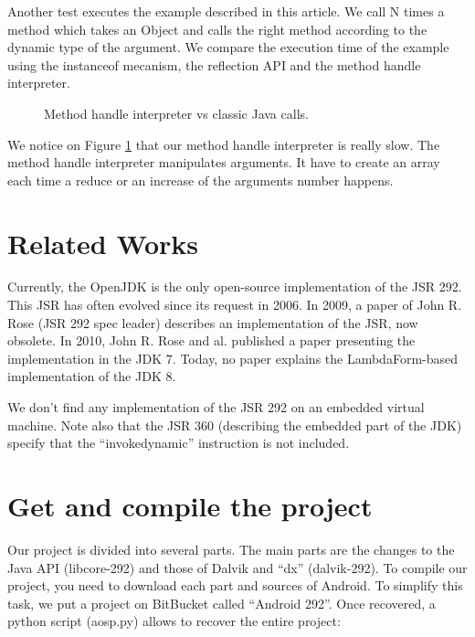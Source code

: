 \documentclass{sig-alternate}
\def \Jsr{JSR\xspace}
\def \JSR{\Jsr 292\xspace}
\begin{document}
  Another test executes the example described in this article.
  We call N times a method which takes an Object and calls the right method according to the dynamic type of the argument.
  We compare the execution time of the example using the instanceof mecanism, the reflection API and the method handle interpreter.

  \begin{figure}[!h]
    \resizebox{\linewidth}{!}{}
    \caption{Method handle interpreter vs classic Java calls.}
    \label{Rmutable}
  \end{figure}

  We notice on Figure \ref{Rmutable} that our method handle interpreter is really slow.
  The method handle interpreter manipulates arguments.
  It have to create an array each time a reduce or an increase of the arguments number happens.

\section{Related Works}

  Currently, the OpenJDK is the only open-source implementation of the \JSR.
  This JSR has often evolved since its request in 2006\cite{jcp-jsr-292}.
  In 2009, a paper of John R. Rose (\JSR spec leader) describes an implementation of the \Jsr, now obsolete\cite{vmil-rose-indy-2009}.
  In 2010, John R. Rose and al. published a paper presenting the implementation in the JDK 7\cite{pppj-rose-indy-2010}.
  Today, no paper explains the LambdaForm-based implementation of the JDK 8.

  We don't find any implementation of the \JSR on an embedded virtual machine.
  Note also that the \Jsr 360 (describing the embedded part of the JDK) specify that the ``invokedynamic'' instruction is not included\cite{jcp-jsr-360}.

\appendix
\section{Get and compile the project}

  Our project is divided into several parts.
  The main parts are the changes to the Java API (libcore-292\cite{bb-libcore}) and those of Dalvik and ``dx'' (dalvik-292\cite{bb-dalvik}).
  To compile our project, you need to download each part and sources of Android.
  To simplify this task, we put a project on BitBucket called ``Android 292''\cite{bb-android}.
  Once recovered, a python script (aosp.py) allows to recover the entire project:
\end{document}
